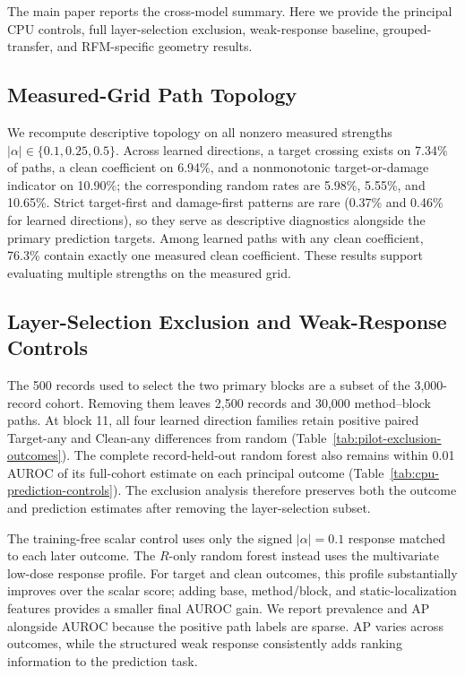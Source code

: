 The main paper reports the cross-model summary. Here we provide the principal
CPU controls, full layer-selection exclusion, weak-response baseline,
grouped-transfer, and RFM-specific geometry results.



\subsection{Measured-Grid Path Topology}

We recompute descriptive topology on all nonzero measured strengths
$|\alpha|\in\{0.1,0.25,0.5\}$. Across learned directions, a target crossing
exists on 7.34\% of paths, a clean coefficient on 6.94\%, and a nonmonotonic
target-or-damage indicator on 10.90\%; the corresponding random rates are
5.98\%, 5.55\%, and 10.65\%. Strict target-first and damage-first patterns are
rare (0.37\% and 0.46\% for learned directions), so they serve as descriptive
diagnostics alongside the primary prediction targets. Among learned paths with
any clean coefficient, 76.3\% contain exactly one measured clean coefficient.
These results support evaluating multiple strengths on the measured grid.

\subsection{Layer-Selection Exclusion and Weak-Response Controls}

The 500 records used to select the two primary blocks are a subset of the
3,000-record cohort. Removing them leaves 2,500 records and 30,000
method--block paths. At block 11, all four learned direction families retain
positive paired Target-any and Clean-any differences from random
(Table~\ref{tab:pilot-exclusion-outcomes}). The complete record-held-out random
forest also remains within 0.01 AUROC of its full-cohort estimate on each
principal outcome (Table~\ref{tab:cpu-prediction-controls}). The exclusion
analysis therefore preserves both the outcome and prediction estimates after
removing the layer-selection subset.

The training-free scalar control uses only the signed $|\alpha|=0.1$ response
matched to each later outcome. The $R$-only random forest instead uses the
multivariate low-dose response profile. For target and clean outcomes, this
profile substantially improves over the scalar score; adding base,
method/block, and static-localization features provides a smaller final AUROC
gain. We report prevalence and AP alongside AUROC because the positive path
labels are sparse. AP varies across outcomes, while the structured weak response
consistently adds ranking information to the prediction task.

